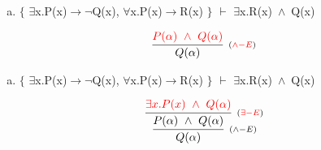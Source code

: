 \documentclass[aspectratio=43]{beamer}
\newcommand{\ria}{$\rightarrow$}
\newcommand{\fall}{$\forall$}
\newcommand{\ex}{$\exists$}
\newcommand{\nao}{$\neg$}
\newcommand{\andd}{$\wedge$}
\begin{document}
    \begin{frame}[fragile]
    
    	\begin{enumerate}[d)]
			\item $\{$ \ex x.P(x)\ria \nao Q(x), \fall x.P(x)\ria R(x) $\}$ $\vdash$ \ex x.R(x)\ \andd\ Q(x) \\
		\end{enumerate}
        
        \vspace{70pt}
        
        \[
        \begin{array}{c}
		
        	\infer[_{(\textcolor{red}{\land -E})}] 
                	{Q(\alpha)}
                    {\textcolor{red}{P(\alpha)\ \land \ Q(\alpha)}}
		\end{array}
        \]
        
	\end{frame}
    
    \begin{frame}[fragile]
    
    	\begin{enumerate}[d)]
			\item $\{$ \ex x.P(x)\ria \nao Q(x), \fall x.P(x)\ria R(x) $\}$ $\vdash$ \ex x.R(x)\ \andd\ Q(x) \\
		\end{enumerate}
        
        \vspace{80pt}
        
        \[
        \begin{array}{c}
		
        	\infer[_{(\land -E)}] 
                	{Q(\alpha)}
                    {\infer[_{(\textcolor{red}{\exists -E})}]
                    	{P(\alpha)\ \land \ Q(\alpha)}
                    	{\textcolor{red}{\exists x.P(x)\ \land \ Q(\alpha)}}
                    }
		\end{array}
        \]
        
	\end{frame}
    
\end{document}
